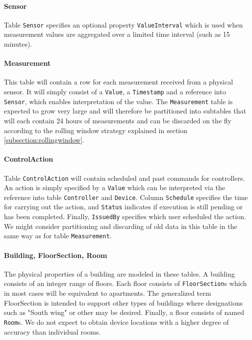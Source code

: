 \paragraph{Sensor} 
Table \texttt{Sensor} specifies an optional property \texttt{ValueInterval} which is used when measurement values are aggregated over a limited time interval (such as 15 minutes). 

\paragraph{Measurement} 
This table will contain a row for each measurement received from a physical sensor. It will simply consist of a \texttt{Value}, a \texttt{Timestamp} and a reference into \texttt{Sensor}, which enables interpretation of the value. The \texttt{Measurement} table is expected to grow very large and will therefore be partitioned into subtables that will each contain 24 hours of measurements and can be discarded on the fly according to the rolling window strategy explained in section \ref{subsection:rollingwindow}.

\paragraph{ControlAction} 
Table \texttt{ControlAction} will contain scheduled and past commands for controllers. An action is simply specified by a \texttt{Value} which can be interpreted via the reference into table \texttt{Controller} and \texttt{Device}. Column \texttt{Schedule} specifies the time for carrying out the action, and \texttt{Status} indicates if execution is still pending or has been completed. Finally, \texttt{IssuedBy} specifies which user scheduled the action. We might consider partitioning and discarding of old data in this table in the same way as for table \texttt{Measurement}.

\paragraph{Building, FloorSection, Room}
The physical properties of a building are modeled in these tables. A building consists of an integer range of floors. Each floor consists of \texttt{FloorSection}s which in most cases will be equivalent to apartments. The generalized term FloorSection is intended to support other types of buildings where designations such as "South wing" or other may be desired. Finally, a floor consists of named \texttt{Room}s. We do not expect to obtain device locations with a higher degree of accuracy than individual rooms.


